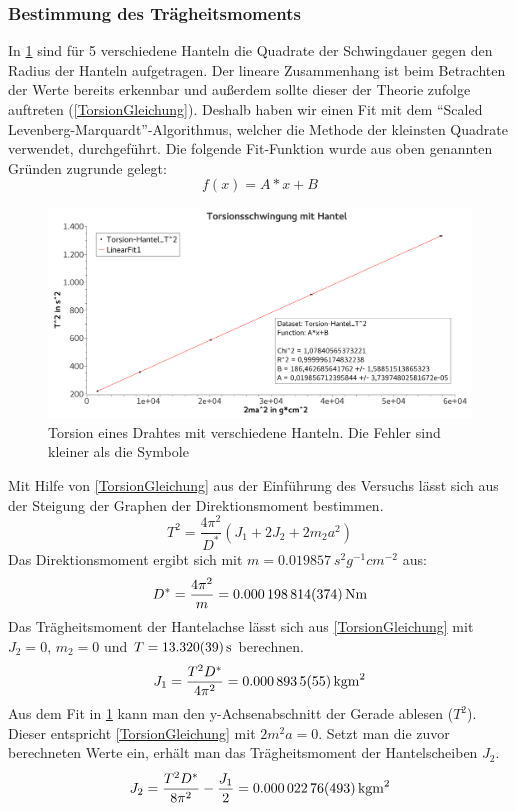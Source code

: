 \documentclass[
	a4paper,
	12pt,
	pagesize,
	ngerman
]{scrartcl}
\begin{document}
	\subsubsection*{Bestimmung des Trägheitsmoments}
	In \cref{TorsionGraph} sind für 5 verschiedene Hanteln die Quadrate der Schwingdauer gegen den Radius der Hanteln aufgetragen. Der lineare Zusammenhang ist beim Betrachten der Werte bereits erkennbar und außerdem sollte dieser der Theorie zufolge auftreten (\cref{TorsionGleichung}).
	Deshalb haben wir einen Fit mit dem \enquote{Scaled Levenberg-Marquardt}-Algorithmus, welcher die Methode der kleinsten Quadrate verwendet, durchgeführt. Die folgende Fit-Funktion wurde aus oben genannten Gründen zugrunde gelegt:
	\begin{equation}
		f(x)=A*x+B
	\end{equation}
	\begin{figure}[tb]
		\includegraphics[width=1\textwidth]{Torsion}
		\centering
		\caption{Torsion eines Drahtes mit verschiedene Hanteln. Die Fehler sind kleiner als die Symbole}
		\label{TorsionGraph}
		\centering
	\end{figure}
	Mit Hilfe von \cref{TorsionGleichung} aus der Einführung des Versuchs lässt sich aus der Steigung der Graphen der Direktionsmoment bestimmen.
	\begin{equation}
		\label{TorsionGleichung}
		T^2 = \frac{4\pi^2}{D^*} (J_1 + 2J_2 + 2m_2 a^2)
	\end{equation}
	Das Direktionsmoment ergibt sich mit $m=\SI{0,019857}{s^2g^{-1}cm^{-2}}$ aus:
	\begin{equation}
	D^* = \frac{4\pi^2}{m} = \SI{0,000198814\pm 0,000000374}{Nm} 
	\end{equation}
	Das Trägheitsmoment der Hantelachse lässt sich aus \cref{TorsionGleichung} mit $J_2=0$, $m_2=0$ und $T=\SI{13,32 \pm0,039}{s}$ berechnen.
	\begin{equation}
		J_1= \frac{T^2D^*}{4\pi^2} = \SI{0,0008935 \pm ,0000055}{kgm^2}
	\end{equation}
	Aus dem Fit in \cref{TorsionGraph} kann man den y-Achsenabschnitt der Gerade ablesen ($T^2$). Dieser entspricht \cref{TorsionGleichung} mit $2m^2a=0$. Setzt man die zuvor berechneten Werte ein, erhält man das Trägheitsmoment der Hantelscheiben $J_2$. %
	\begin{equation}
		J_2 = \frac{T^2D^*}{8\pi^2} - \frac{J_1}{2} = \SI{0,00002276 \pm 0,00000493}{kgm^2}
	\end{equation}
\end{document}
